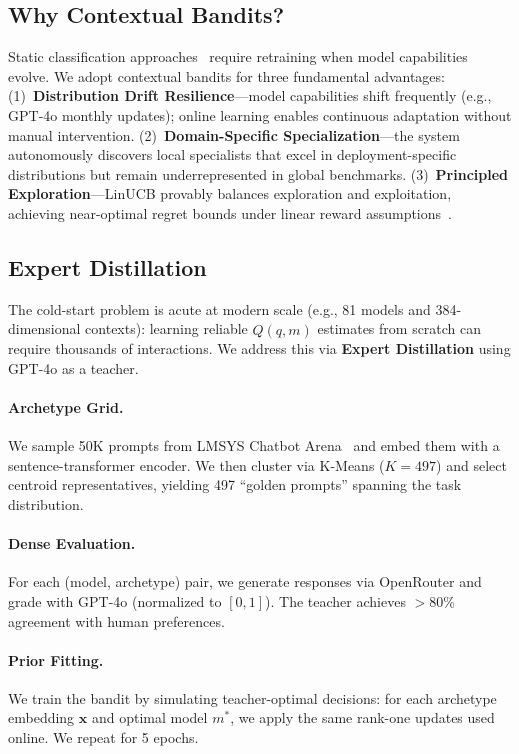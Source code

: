 \subsection{Why Contextual Bandits?}
\label{sec:pivot}

Static classification approaches~\cite{ong2024routellm} require retraining when model capabilities evolve. We adopt contextual bandits for three fundamental advantages: (1)~\textbf{Distribution Drift Resilience}---model capabilities shift frequently (e.g., GPT-4o monthly updates); online learning enables continuous adaptation without manual intervention. (2)~\textbf{Domain-Specific Specialization}---the system autonomously discovers local specialists that excel in deployment-specific distributions but remain underrepresented in global benchmarks. (3)~\textbf{Principled Exploration}---LinUCB provably balances exploration and exploitation, achieving near-optimal regret bounds under linear reward assumptions~\cite{abbasi2011improved}.

\subsection{Expert Distillation}
\label{sec:distillation}

The cold-start problem is acute at modern scale (e.g., 81 models and 384-dimensional contexts): learning reliable $\hat{Q}(q,m)$ estimates from scratch can require thousands of interactions. We address this via \textbf{Expert Distillation} using GPT-4o as a teacher.

\paragraph{Archetype Grid.} We sample 50K prompts from LMSYS Chatbot Arena~\cite{zheng2023judging} and embed them with a sentence-transformer encoder. We then cluster via K-Means ($K=497$) and select centroid representatives, yielding 497 ``golden prompts'' spanning the task distribution.

\paragraph{Dense Evaluation.} For each (model, archetype) pair, we generate responses via OpenRouter and grade with GPT-4o (normalized to $[0,1]$). The teacher achieves $>$80\% agreement with human preferences.

\paragraph{Prior Fitting.} We train the bandit by simulating teacher-optimal decisions: for each archetype embedding $\mathbf{x}$ and optimal model $m^*$, we apply the same rank-one updates used online. We repeat for 5 epochs.


